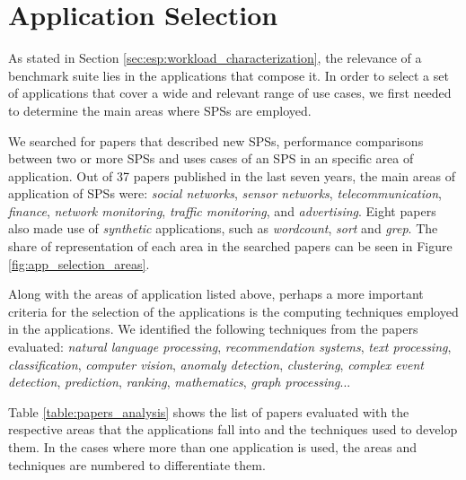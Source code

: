 \documentclass[ppgc,diss,english]{iiufrgs}
\begin{document}
\section{Application Selection}
\label{sec:application-selection}

As stated in Section \ref{sec:esp:workload_characterization}, the relevance of a benchmark suite lies in the applications that compose it. In order to select a set of applications that cover a wide and relevant range of use cases, we first needed to determine the main areas where SPSs are employed.

We searched for papers that described new SPSs, performance comparisons between two or more SPSs and uses cases of an SPS in an specific area of application. Out of 37 papers published in the last seven years, the main areas of application of SPSs were: \emph{social networks}, \emph{sensor networks}, \emph{telecommunication}, \emph{finance}, \emph{network monitoring}, \emph{traffic monitoring}, and \emph{advertising}. Eight papers also made use of \emph{synthetic} applications, such as \emph{wordcount}, \emph{sort} and \emph{grep}. The share of representation of each area in the searched papers can be seen in Figure \ref{fig:app_selection_areas}.

Along with the areas of application listed above, perhaps a more important criteria for the selection of the applications is the computing techniques employed in the applications. We identified the following techniques from the papers evaluated: \emph{natural language processing}, \emph{recommendation systems}, \emph{text processing}, \emph{classification}, \emph{computer vision}, \emph{anomaly detection}, \emph{clustering}, \emph{complex event detection}, \emph{prediction}, \emph{ranking}, \emph{mathematics}, \emph{graph processing}...

Table \ref{table:papers_analysis} shows the list of papers evaluated with the respective areas that the applications fall into and the techniques used to develop them. In the cases where more than one application is used, the areas and techniques are numbered to differentiate them.


\end{document}
